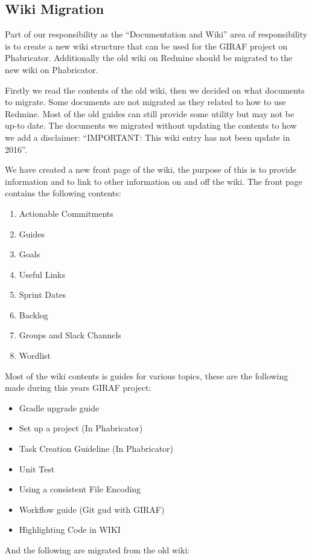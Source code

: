 \subsection{Wiki Migration}
Part of our responsibility as the ``Documentation and Wiki'' area of responsibility is to create a new wiki structure that can be used for the GIRAF project on Phabricator.
Additionally the old wiki on Redmine should be migrated to the new wiki on Phabricator. 

Firstly we read the contents of the old wiki, then we decided on what documents to migrate. 
Some documents are not migrated as they related to how to use Redmine. 
Most of the old guides can still provide some utility but may not be up-to date.
The documents we migrated without updating the contents to how we add a disclaimer: ``IMPORTANT: This wiki entry has not been update in 2016''.

We have created a new front page of the wiki, the purpose of this is to provide information and to link to other information on and off the wiki.
The front page contains the following contents: 

\begin{enumerate}
    \item Actionable Commitments
    \item Guides
    \item Goals
    \item Useful Links
    \item Sprint Dates
    \item Backlog
    \item Groups and Slack Channels
    \item Wordlist
\end{enumerate}

Most of the wiki contents is guides for various topics, these are the following made during this years GIRAF project:

\begin{itemize}
    \item Gradle upgrade guide
    \item Set up a project (In Phabricator)
    \item Task Creation Guideline (In Phabricator)
    \item Unit Test
    \item Using a consistent File Encoding
    \item Workflow guide (Git gud with GIRAF)
    \item Highlighting Code in WIKI
\end{itemize}
\bigskip
And the following are migrated from the old wiki:

